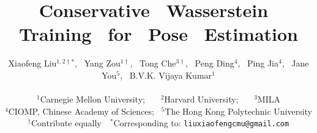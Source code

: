 \documentclass[10pt,twocolumn,letterpaper]{article}
\begin{document}
\title{Conservative~ Wasserstein~ Training~ for~ Pose~ Estimation}

\author{Xiaofeng Liu{$^{1,2\dag*}$},~ Yang Zou{$^{1\dag}$},~ Tong Che{$^{3\dag}$},~ Peng Ding{$^{4}$},~ Ping Jia{$^{4}$},~ Jane You{$^{5}$},~ B.V.K. Vijaya Kumar{$^{1}$}\\\vspace{-8pt}{\small~}\\
{$^{1}$}Carnegie Mellon University;~~~ {$^{2}$}Harvard University;~~~ {$^{3}$}MILA \\ {$^{4}$}CIOMP, Chinese Academy of Sciences;~ {$^{5}$}The Hong Kong Polytechnic University\\
{\small{{$^{\dag}$}Contribute equally~~{$^{*}$}Corresponding to: \tt{liuxiaofengcmu@gmail.com}}}
}



\maketitle
\thispagestyle{empty}

































{\small


}
\end{document}
